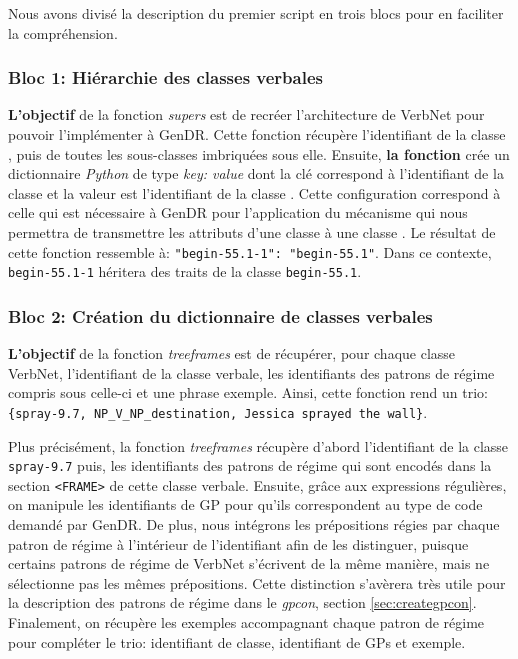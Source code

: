Nous avons divisé la description du premier script en trois blocs pour en faciliter la compréhension.

\subsubsection{Bloc 1: Hiérarchie des classes verbales}

\textbf{L'objectif} de la fonction \emph{supers} est de recréer l'architecture de VerbNet pour pouvoir l'implémenter à GenDR. Cette fonction récupère l'identifiant de la classe , puis de toutes les sous-classes imbriquées sous elle. Ensuite, \textbf{la fonction} crée un dictionnaire \emph{Python} de type \emph{key: value} dont la clé correspond à l'identifiant de la classe  et la valeur est l'identifiant de la classe . Cette configuration correspond à celle qui est nécessaire à GenDR pour l'application du mécanisme qui nous permettra de transmettre les attributs d'une classe  à une classe . Le résultat de cette fonction ressemble à: \lstinline|"begin-55.1-1": "begin-55.1"|. Dans ce contexte, \texttt{begin-55.1-1} héritera des traits de la classe \texttt{begin-55.1}.

\subsubsection{Bloc 2: Création du dictionnaire de classes verbales}

\textbf{L'objectif} de la fonction \emph{treeframes} est de récupérer, pour chaque classe VerbNet, l'identifiant de la classe verbale, les identifiants des patrons de régime compris sous celle-ci et une phrase exemple. Ainsi, cette fonction rend un trio: \lstinline|{spray-9.7, NP_V_NP_destination, Jessica sprayed the wall}|.

Plus précisément, la fonction \emph{treeframes} récupère d'abord l'identifiant de la classe \texttt{spray-9.7} puis, les identifiants des patrons de régime qui sont encodés dans la section \texttt{<FRAME>} de cette classe verbale. Ensuite, grâce aux expressions régulières, on manipule les identifiants de \ac{GP} pour qu'ils correspondent au type de code demandé par GenDR. De plus, nous intégrons les prépositions régies par chaque patron de régime à l'intérieur de l'identifiant afin de les distinguer, puisque certains patrons de régime de VerbNet s'écrivent de la même manière, mais ne sélectionne pas les mêmes prépositions. Cette distinction s'avèrera très utile pour la description des patrons de régime dans le \emph{gpcon}, section \ref{sec:creategpcon}. Finalement, on récupère les exemples accompagnant chaque patron de régime pour compléter le trio: identifiant de classe, identifiant de \acp{GP} et exemple. 


